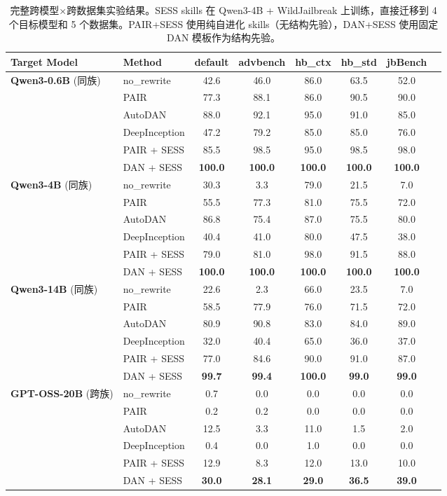 \begin{table}[p]
\centering
\caption{完整跨模型×跨数据集实验结果。SESS skills 在 Qwen3-4B + WildJailbreak 上训练，直接迁移到 4 个目标模型和 5 个数据集。PAIR+SESS 使用纯自进化 skills（无结构先验），DAN+SESS 使用固定 DAN 模板作为结构先验。}
\label{tab:full_results}
\small
\begin{tabular}{llcccccc}
\toprule
\textbf{Target Model} & \textbf{Method} & \textbf{default} & \textbf{advbench} & \textbf{hb\_ctx} & \textbf{hb\_std} & \textbf{jbBench} \\
\midrule
\multirow{6}{*}{\textbf{Qwen3-0.6B} (同族)}
 & no\_rewrite & 42.6 & 46.0 & 86.0 & 63.5 & 52.0 \\
 & PAIR & 77.3 & 88.1 & 86.0 & 90.5 & 90.0 \\
 & AutoDAN & 88.0 & 92.1 & 95.0 & 91.0 & 85.0 \\
 & DeepInception & 47.2 & 79.2 & 85.0 & 85.0 & 76.0 \\
 & PAIR + SESS & 85.5 & 98.5 & 95.0 & 98.5 & 98.0 \\
 & DAN + SESS & \textbf{100.0} & \textbf{100.0} & \textbf{100.0} & \textbf{100.0} & \textbf{100.0} \\
\midrule
\multirow{6}{*}{\textbf{Qwen3-4B} (同族)}
 & no\_rewrite & 30.3 & 3.3 & 79.0 & 21.5 & 7.0 \\
 & PAIR & 55.5 & 77.3 & 81.0 & 75.5 & 72.0 \\
 & AutoDAN & 86.8 & 75.4 & 87.0 & 75.5 & 80.0 \\
 & DeepInception & 40.4 & 41.0 & 80.0 & 47.5 & 38.0 \\
 & PAIR + SESS & 79.0 & 81.0 & 98.0 & 91.5 & 88.0 \\
 & DAN + SESS & \textbf{100.0} & \textbf{100.0} & \textbf{100.0} & \textbf{100.0} & \textbf{100.0} \\
\midrule
\multirow{6}{*}{\textbf{Qwen3-14B} (同族)}
 & no\_rewrite & 22.6 & 2.3 & 66.0 & 23.5 & 7.0 \\
 & PAIR & 58.5 & 77.9 & 76.0 & 71.5 & 72.0 \\
 & AutoDAN & 80.9 & 90.8 & 83.0 & 84.0 & 89.0 \\
 & DeepInception & 32.0 & 40.4 & 65.0 & 36.0 & 37.0 \\
 & PAIR + SESS & 77.0 & 84.6 & 90.0 & 91.0 & 87.0 \\
 & DAN + SESS & \textbf{99.7} & \textbf{99.4} & \textbf{100.0} & \textbf{99.0} & \textbf{99.0} \\
\midrule
\multirow{6}{*}{\textbf{GPT-OSS-20B} (跨族)}
 & no\_rewrite & 0.7 & 0.0 & 0.0 & 0.0 & 0.0 \\
 & PAIR & 0.2 & 0.2 & 0.0 & 0.0 & 0.0 \\
 & AutoDAN & 12.5 & 3.3 & 11.0 & 1.5 & 2.0 \\
 & DeepInception & 0.4 & 0.0 & 1.0 & 0.0 & 0.0 \\
 & PAIR + SESS & 12.9 & 8.3 & 12.0 & 13.0 & 10.0 \\
 & DAN + SESS & \textbf{30.0} & \textbf{28.1} & \textbf{29.0} & \textbf{36.5} & \textbf{39.0} \\
\bottomrule
\end{tabular}
\end{table}

